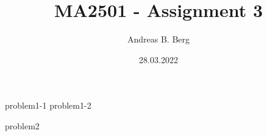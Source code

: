 \documentclass{article}
\begin{document}
\mainmatter

\title{MA2501 - Assignment 3}
\author{Andreas B. Berg}
\date{28.03.2022}
\maketitle
\thispagestyle{fancy}

{problem1-1}
\pagebreak
{problem1-2}

\pagebreak
{problem2}


\end{document}
